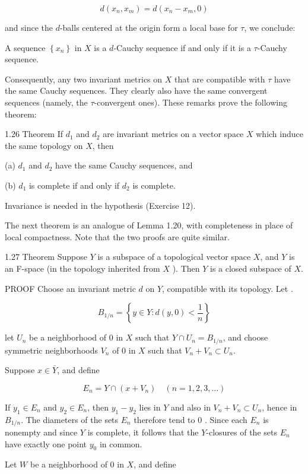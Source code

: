 \documentclass[10pt]{article}
\begin{document}
$$
d\left(x_{n}, x_{m}\right)=d\left(x_{n}-x_{m}, 0\right)
$$

and since the $d$-balls centered at the origin form a local base for $\tau$, we conclude:

A sequence $\left\{x_{n}\right\}$ in $X$ is a $d$-Cauchy sequence if and only if it is a $\tau$-Cauchy sequence.

Consequently, any two invariant metrics on $X$ that are compatible with $\tau$ have the same Cauchy sequences. They clearly also have the same convergent sequences (namely, the $\tau$-convergent ones). These remarks prove the following theorem:

1.26 Theorem If $d_{1}$ and $d_{2}$ are invariant metrics on a vector space $X$ which induce the same topology on $X$, then

(a) $d_{1}$ and $d_{2}$ have the same Cauchy sequences, and

(b) $d_{1}$ is complete if and only if $d_{2}$ is complete.

Invariance is needed in the hypothesis (Exercise 12).

The next theorem is an analogue of Lemma 1.20, with completeness in place of local compactness. Note that the two proofs are quite similar.

1.27 Theorem Suppose $Y$ is a subspace of a topological vector space $X$, and $Y$ is an F-space (in the topology inherited from $X$ ). Then $Y$ is a closed subspace of $X$.

PROOF Choose an invariant metric $d$ on $Y$, compatible with its topology. Let .

$$
B_{1 / n}=\left\{y \in Y: d(y, 0)<\frac{1}{n}\right\}
$$

let $U_{n}$ be a neighborhood of 0 in $X$ such that $Y \cap U_{n}=B_{1 / n}$, and choose symmetric neighborhoods $V_{n}$ of 0 in $X$ such that $V_{n}+V_{n} \subset U_{n}$.

Suppose $x \in \bar{Y}$, and define

$$
E_{n}=Y \cap\left(x+V_{n}\right) \quad(n=1,2,3, \ldots)
$$

If $y_{1} \in E_{n}$ and $y_{2} \in E_{n}$, then $y_{1}-y_{2}$ lies in $Y$ and also in $V_{n}+V_{n} \subset U_{n}$, hence in $B_{1 / n}$. The diameters of the sets $E_{n}$ therefore tend to 0 . Since each $E_{n}$ is nonempty and since $Y$ is complete, it follows that the $Y$-closures of the sets $E_{n}$ have exactly one point $y_{0}$ in common.

Let $W$ be a neighborhood of 0 in $X$, and define
\end{document}
